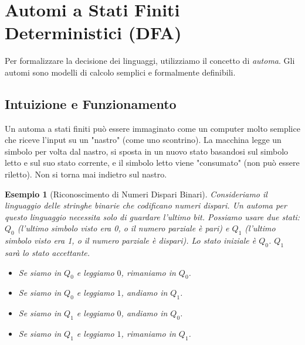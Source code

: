 \documentclass[a4paper, 11pt]{book} %
\newtheorem{example}[theorem]{Esempio}
\theoremstyle{definition}
\begin{document}
\section{Automi a Stati Finiti Deterministici (DFA)}
Per formalizzare la decisione dei linguaggi, utilizziamo il concetto di \emph{automa}. Gli automi sono modelli di calcolo semplici e formalmente definibili.

\subsection{Intuizione e Funzionamento}
Un automa a stati finiti può essere immaginato come un computer molto semplice che riceve l'input su un "nastro" (come uno scontrino). La macchina legge un simbolo per volta dal nastro, si sposta in un nuovo stato basandosi sul simbolo letto e sul suo stato corrente, e il simbolo letto viene "consumato" (non può essere riletto). Non si torna mai indietro sul nastro.

\begin{example}[Riconoscimento di Numeri Dispari Binari]
Consideriamo il linguaggio delle stringhe binarie che codificano numeri dispari. Un automa per questo linguaggio necessita solo di guardare l'ultimo bit. Possiamo usare due stati: $Q_0$ (l'ultimo simbolo visto era 0, o il numero parziale è pari) e $Q_1$ (l'ultimo simbolo visto era 1, o il numero parziale è dispari). Lo stato iniziale è $Q_0$. $Q_1$ sarà lo stato accettante.
\begin{itemize}
    \item Se siamo in $Q_0$ e leggiamo $0$, rimaniamo in $Q_0$.
    \item Se siamo in $Q_0$ e leggiamo $1$, andiamo in $Q_1$.
    \item Se siamo in $Q_1$ e leggiamo $0$, andiamo in $Q_0$.
    \item Se siamo in $Q_1$ e leggiamo $1$, rimaniamo in $Q_1$.
\end{itemize}
\begin{center}
\end{center}
\end{example}
\end{document}
